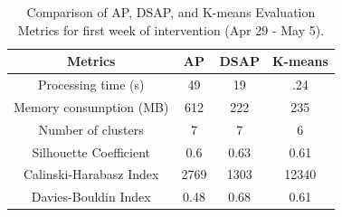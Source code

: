 \documentclass[../UNBThesis2.tex]{subfiles}
\begin{document}


\begin{table}[!h]
    \centering
    \caption{Comparison of AP, DSAP, and K-means Evaluation Metrics for first week of intervention (Apr 29 - May 5).}
    \label{all3}
    \begin{tabular}{|c|c|c|c|}
    \hline
      Metrics & AP & DSAP & K-means  \\
     \hline
      Processing time (s)   & 49  & 19 & .24      \\
     \hline
      Memory consumption (MB)   &  612   & 222 & 235 \\
     \hline
      Number of clusters  &  7  & 7 & 6   \\
      \hline
      Silhouette Coefficient    &    0.6 & 0.63 & 0.61\\
    \hline
    Calinski-Harabasz Index     & 2769 & 1303 & 12340      \\
    \hline
     Davies-Bouldin Index   &     0.48 & 0.68 & 0.61\\
    \hline
    \end{tabular}
\end{table}



\end{document}
